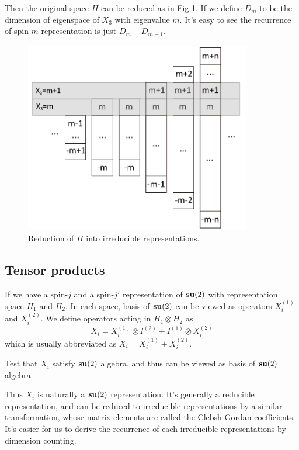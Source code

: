 \documentclass[12pt]{book}
\begin{document}
	Then the original space $H$ can be reduced as in Fig \ref{fig:su2s}. If we define $D_m$ to be the dimension of eigenspace of $X_3$ with eigenvalue $m$. It's easy to see the recurrence of spin-$m$ representation is just $D_m-D_{m+1}$.
	
	\begin{figure}[htb]
		\centering  
		\includegraphics[width=280pt]{resources/figures/3_2_su2s.pdf}
		\caption{Reduction of $H$ into irreducible representations.}
		\label{fig:su2s} 
	\end{figure}
	\subsection{Tensor products}
	If we have a spin-$j$ and a spin-$j'$ representation of ${\bf su}(2)$ with representation space $H_1$ and $H_2$. In each space, basis of ${\bf su}(2)$ can be viewed as operators $X_i^{(1)}$ and $X_i^{(2)}$. We define operators acting in $H_1\otimes H_2$ as
	\begin{equation}
		X_i=X_i^{(1)}\otimes I^{(2)}+I^{(1)}\otimes X_i^{(2)}
	\end{equation}
	which is usually abbreviated as $X_i=X_i^{(1)}+X_i^{(2)}$.
	\begin{myExercise}
		Test that $X_i$ satisfy ${\bf su}(2)$ algebra, and thus can be viewed as basis of ${\bf su}(2)$ algebra.
	\end{myExercise}
	
	Thus $X_i$ is naturally a ${\bf su}(2)$ representation. It's generally a reducible representation, and can be reduced to irreducible representations by a similar transformation, whose matrix elements are called the Clebsh-Gordan coefficients. It's easier for us to derive the recurrence of each irreducible representations by dimension counting.
	
\end{document}
